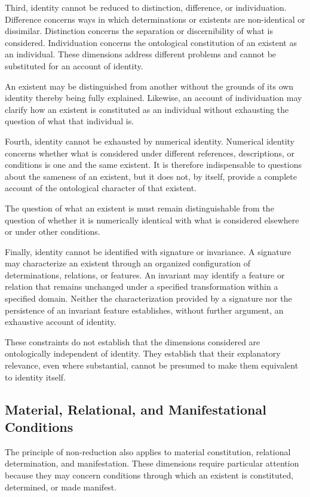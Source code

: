 Third, identity cannot be reduced to distinction, difference,
or individuation. Difference concerns ways in which
determinations or existents are non-identical or dissimilar.
Distinction concerns the separation or discernibility of
what is considered. Individuation concerns the ontological
constitution of an existent as an individual. These dimensions
address different problems and cannot be substituted for
an account of identity.

An existent may be distinguished from another without the
grounds of its own identity thereby being fully explained.
Likewise, an account of individuation may clarify how an
existent is constituted as an individual without exhausting
the question of what that individual is.

Fourth, identity cannot be exhausted by numerical identity.
Numerical identity concerns whether what is considered
under different references, descriptions, or conditions
is one and the same existent. It is therefore indispensable
to questions about the sameness of an existent, but it does
not, by itself, provide a complete account of the ontological
character of that existent.

The question of what an existent is must remain distinguishable
from the question of whether it is numerically identical
with what is considered elsewhere or under other conditions.

Finally, identity cannot be identified with signature or
invariance. A signature may characterize an existent through
an organized configuration of determinations, relations, or
features. An invariant may identify a feature or relation
that remains unchanged under a specified transformation
within a specified domain. Neither the characterization
provided by a signature nor the persistence of an invariant
feature establishes, without further argument, an exhaustive
account of identity.

These constraints do not establish that the dimensions
considered are ontologically independent of identity. They
establish that their explanatory relevance, even where
substantial, cannot be presumed to make them equivalent
to identity itself.

\subsection{Material, Relational, and Manifestational Conditions}

The principle of non-reduction also applies to material
constitution, relational determination, and manifestation.
These dimensions require particular attention because they
may concern conditions through which an existent is
constituted, determined, or made manifest.

